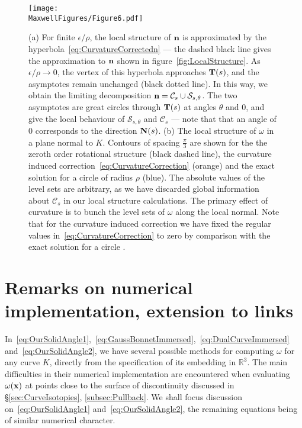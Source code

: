     \begin{figure}[htbp]
        \begin{centering}
            \texttt{[image: \\MaxwellFigures/Figure6.pdf]}
            \caption[Transverse solid angle structure.]{(a) For finite $\epsilon/\rho$, the local structure of $\bf n$ is approximated by the hyperbola~\eqref{eq:CurvatureCorrectedn} --- the dashed black line gives the approximation to $\bf n$ shown in figure~\ref{fig:LocalStructure}. As $\epsilon /\rho \rightarrow 0$, the vertex of this hyperbola approaches ${\bf T}(s)$, and the asymptotes remain unchanged (black dotted line). In this way, we obtain the limiting decomposition ${\bf n} = \mathcal{C}_s \cup \mathcal{S}_{s,\theta}$. The two asymptotes are great circles through ${\bf T}(s)$ at angles $\theta$ and $0$, and give the local behaviour of $\mathcal{S}_{s,\theta}$ and $\mathcal{C}_s$ --- note that that an angle of $0$ corresponds to the direction ${\bf N}(s)$. (b) The local structure of $\omega$ in a plane normal to $K$. Contours of spacing $\frac{\pi}{3}$ are shown for the the zeroth order rotational structure (black dashed line), the curvature induced correction~\eqref{eq:CurvatureCorrection} (orange) and the exact solution for a circle of radius $\rho$ (blue). The absolute values of the level sets are arbitrary, as we have discarded global information about $\mathcal{C}_s$ in our local structure calculations. The primary effect of curvature is to bunch the level sets of $\omega$ along the local normal. Note that for the curvature induced correction we have fixed the regular values in~\eqref{eq:CurvatureCorrection} to zero by comparison with the exact solution for a circle \citep{Saffman1992}.}
            \label{fig:CurvatureCorrections}
        \end{centering}
    \end{figure}

    \section{Remarks on numerical implementation, extension to links}
    \label{sec:NumericalImplementation}

    In~\eqref{eq:OurSolidAngle1},~\eqref{eq:GaussBonnetImmersed},~\eqref{eq:DualCurveImmersed} and~\eqref{eq:OurSolidAngle2}, we have several possible methods for computing $\omega$ for any curve $K$, directly from the specification of its embedding in $\mathbb{R}^3$. The main difficulties in their numerical implementation are encountered when evaluating $\omega(\bf x)$ at points close to the surface of discontinuity discussed in \S\ref{sec:CurveIsotopies}, \ref{subsec:Pullback}. We shall focus discussion on~\eqref{eq:OurSolidAngle1} and~\eqref{eq:OurSolidAngle2}, the remaining equations being of similar numerical character.

